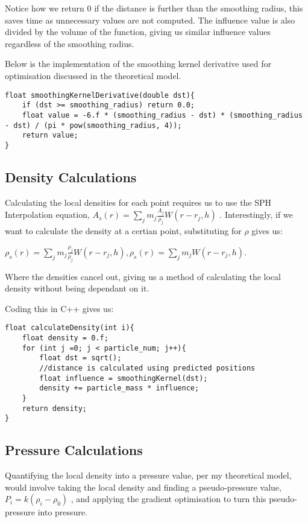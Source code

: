 \documentclass[write-up.tex]{subfiles}
\begin{document}
Notice how we return 0 if the distance is further than the smoothing radius, this saves time as unnecessary values are not computed. The influence value is also divided by the volume of the function, giving us similar influence values regardless of the smoothing radius.

Below is the implementation of the smoothing kernel derivative used for optimisation discussed in the theoretical model.

\begin{lstlisting}
float smoothingKernelDerivative(double dst){
    if (dst >= smoothing_radius) return 0.0;
    float value = -6.f * (smoothing_radius - dst) * (smoothing_radius - dst) / (pi * pow(smoothing_radius, 4));
    return value;
}
\end{lstlisting}

\subsection{Density Calculations}
Calculating the local densities for each point requires us to use the SPH Interpolation equation, $A_s(r) = \sum_{j} m_j \frac{A_j}{\rho_j}W(r-r_j, h)$ \cite{muller}. Interestingly, if we want to calculate the density at a certian point, substituting for $\rho$ gives us:

\begin{center}
 $ \rho_s(r) = \sum_{j} m_j \frac{\rho_j}{\rho_j}W(r-r_j, h),
 \rho_s(r) = \sum_{j} m_j W(r-r_j, h).$
\end{center}
 Where the densities cancel out, giving us a method of calculating the local density without being dependant on it.

\noindent Coding this in C++ gives us:
\begin{lstlisting}
float calculateDensity(int i){
    float density = 0.f;
    for (int j =0; j < particle_num; j++){
        float dst = sqrt();
        //distance is calculated using predicted positions
        float influence = smoothingKernel(dst);
        density += particle_mass * influence;
    }
    return density;
}
\end{lstlisting}

\subsection{Pressure Calculations}
Quantifying the local density into a pressure value, per my theoretical model, would involve taking the local density and finding a pseudo-pressure value, $P_i = k(\rho_i - \rho_0)$ \cite{clavet}, and applying the gradient optimisation to turn this pseudo-pressure into pressure.
\end{document}
